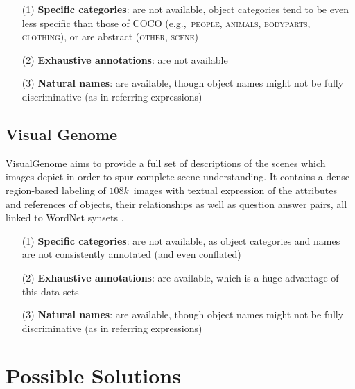 \documentclass[runningheads]{llncs}
\newcommand{\vgenome}{VisualGenome\xspace}
\newcommand{\cat}[1]{\textsc{#1}}
\begin{document}
\begin{itemize}
     		\item[(1)] \textbf{Specific categories}: are not available, object categories tend to be even less specific than those of COCO (e.g.,~\cat{people, animals, bodyparts, clothing}), or are abstract (\cat{other, scene})
		\item[(2)] \textbf{Exhaustive annotations}: are not available
		   \item[(3)] \textbf{Natural names}: are available, though object names might not be fully discriminative (as in referring expressions)

\end{itemize}


\subsection{Visual Genome}

\vgenome \cite{krishna2016visualgenome} aims to provide a full set of descriptions of the scenes which images depict in order to spur complete scene understanding. 
It contains a dense region-based labeling of $108k$~images with textual expression of the attributes and references of objects, their relationships as well as question answer pairs, all linked to WordNet synsets \cite[see below]{fellbaum1998wordnet}. 


\begin{itemize}
     		\item[(1)] \textbf{Specific categories}: are not available, as object categories and names are not consistently annotated (and even conflated)
				\item[(2)] \textbf{Exhaustive annotations}: are available, which is a huge advantage of this data sets
		   \item[(3)] \textbf{Natural names}: are available, though object names might not be fully discriminative (as in referring expressions)

\end{itemize}

\section{Possible Solutions}
\end{document}
